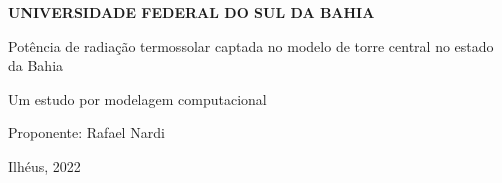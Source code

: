 


\begin{center} {\bf \LARGE UNIVERSIDADE FEDERAL DO SUL DA BAHIA}\end{center}

\begin{center} {\large Potência de radiação termossolar captada no modelo de torre central no estado da Bahia} \end{center}

\begin{center} {\large Um estudo por modelagem computacional } \end{center}

\begin{flushright} Proponente: Rafael Nardi \end{flushright}

\begin{flushright} Ilhéus, 2022 \end{flushright}

